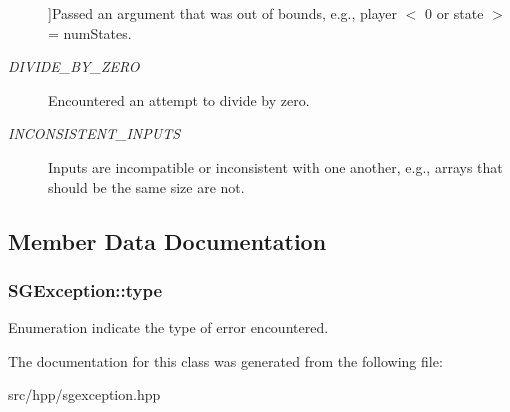 \begin{Desc}
\begin{description}
{}]Passed an argument that was out of bounds, e.\-g., player $<$ 0 or state $>$= num\-States. \item[{\em 
\hypertarget{classSGException_af5054226bbd734c10b3a2e6d0505a984a7382a07da2cb905a6cd8ec97552f07c6}{D\-I\-V\-I\-D\-E\-\_\-\-B\-Y\-\_\-\-Z\-E\-R\-O}\label{classSGException_af5054226bbd734c10b3a2e6d0505a984a7382a07da2cb905a6cd8ec97552f07c6}
}]Encountered an attempt to divide by zero. \item[{\em 
\hypertarget{classSGException_af5054226bbd734c10b3a2e6d0505a984ad57b910815cae13368fce8f27c30f78d}{I\-N\-C\-O\-N\-S\-I\-S\-T\-E\-N\-T\-\_\-\-I\-N\-P\-U\-T\-S}\label{classSGException_af5054226bbd734c10b3a2e6d0505a984ad57b910815cae13368fce8f27c30f78d}
}]Inputs are incompatible or inconsistent with one another, e.\-g., arrays that should be the same size are not. \end{description}
\end{Desc}


\subsection{Member Data Documentation}
\hypertarget{classSGException_af42ea45b5685850a040ac58d4631afa4}{
\subsubsection[{type}]{ S\-G\-Exception\-::type\hspace{0.3cm}{\ttfamily [private]}}}\label{classSGException_af42ea45b5685850a040ac58d4631afa4}
Enumeration indicate the type of error encountered. 

The documentation for this class was generated from the following file\-:\begin{DoxyCompactItemize}
\item 
src/hpp/sgexception.\-hpp\end{DoxyCompactItemize}
